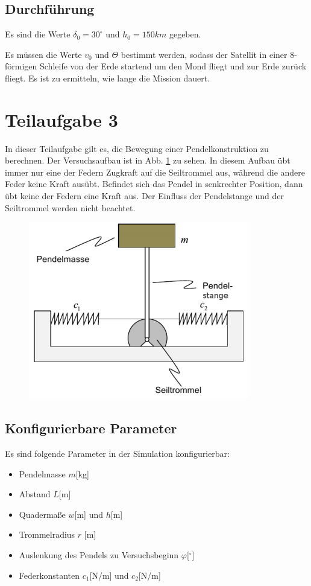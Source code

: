 \documentclass[]{scrartcl}
\begin{document}
\subsection{Durchführung}
Es sind die Werte $\delta_{0} = 30^\circ$ und $h_{0} = 150km$ gegeben.

Es müssen die Werte $v_{0}$ und $\Theta$ bestimmt werden, sodass der Satellit in einer 8-förmigen Schleife von der Erde startend um den Mond fliegt und zur Erde zurück fliegt. Es ist zu ermitteln, wie lange die Mission dauert.

\section{Teilaufgabe 3}
In dieser Teilaufgabe gilt es, die Bewegung einer Pendelkonstruktion zu berechnen. Der Versuchsaufbau ist in Abb. \ref{fig:3_Versuchsaufbau} zu sehen. In diesem Aufbau übt immer nur eine der Federn Zugkraft auf die Seiltrommel aus, während die andere Feder keine Kraft ausübt. Befindet sich das Pendel in senkrechter Position, dann übt keine der Federn eine Kraft aus. Der Einfluss der Pendelstange und der Seiltrommel werden nicht beachtet.

\begin{figure}[H]
\centering
\includegraphics[width=0.5\linewidth]{./3_Versuchsaufbau}
\caption{}
\label{fig:3_Versuchsaufbau}
\end{figure}

\subsection{Konfigurierbare Parameter}
Es sind folgende Parameter in der Simulation konfigurierbar:
\begin{itemize}
\item Pendelmasse $m$[kg]
\item Abstand $L$[m]
\item Quadermaße $w$[m] und $h$[m]
\item Trommelradius $r$ [m]
\item Auslenkung des Pendels zu Versuchsbeginn $\varphi$[$^\circ$]
\item Federkonstanten $c_{1}$[N/m] und $c_{2}$[N/m]
\end{itemize}
\end{document}
